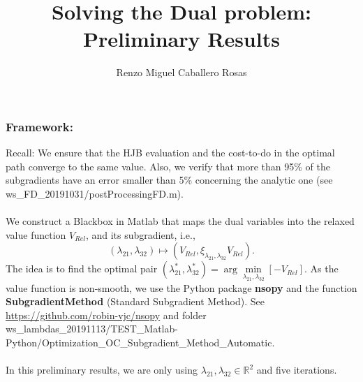 \documentclass[aspectratio=169]{beamer}\usepackage[utf8]{inputenc}
\title{Solving the Dual problem:\\
Preliminary Results}
\subtitle{Renzo Miguel Caballero Rosas}
\newcommand{\R}{\mathbb{R}}
\begin{document}
\begin{frame}
\titlepage
\end{frame}

\begin{frame}\frametitle{Framework:}

Recall: We ensure that the HJB evaluation and the cost-to-do in the optimal path converge to the same value. Also, we verify that more than 95\% of the subgradients have an error smaller than 5\% concerning the analytic one (see {\color{blue}ws\_FD\_20191031/postProcessingFD.m}).\\
\quad\\
We construct a Blackbox in Matlab that maps the dual variables into the relaxed value function $V_{Rel}$, and its subgradient, i.e.,
\begin{equation*}
(\lambda_{21},\lambda_{32})\mapsto(V_{Rel},\xi_{\lambda_{21},\lambda_{32}}V_{Rel}).
\end{equation*}
The idea is to find the optimal pair $(\lambda_{21}^*,\lambda_{32}^*)=\arg\min\limits_{\lambda_{21},\lambda_{32}}\left[-V_{Rel}\right]$. As the value function is non-smooth, we use the Python package \textbf{nsopy} and the function \textbf{SubgradientMethod} (Standard Subgradient Method). See {\color{blue}\url{https://github.com/robin-vjc/nsopy}} and folder {\small{\color{blue}ws\_lambdas\_20191113/TEST\_Matlab-Python/Optimization\_OC\_Subgradient\_Method\_Automatic}}.\\
\quad\\
In this preliminary results, we are only using $\lambda_{21},\lambda_{32}\in\R^2$ and five iterations.

\end{frame}

\end{document}
